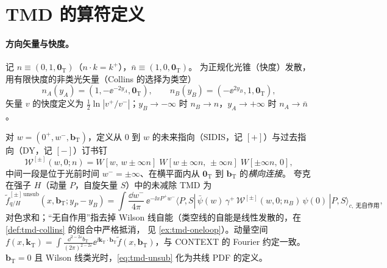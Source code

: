 \section{TMD 的算符定义}
\label{sec:tmd-definitions}

\paragraph{方向矢量与快度。}
记 $n\equiv(0,1,\boldsymbol 0_{\mathrm T})$（$n\cdot k=k^+$），$\bar n\equiv(1,0,\boldsymbol 0_{\mathrm T})$。
为正规化光锥（快度）发散，用有限快度的非类光矢量（Collins 的选择为类空）
\begin{equation}
  n_A(y_A)=(1,-\ee^{-2y_A},\boldsymbol 0_{\mathrm T}),\qquad
  n_B(y_B)=(-\ee^{2y_B},1,\boldsymbol 0_{\mathrm T}),
  \label{eq:tmd-nAnB}
\end{equation}
矢量 $v$ 的快度定义为 $\tfrac12\ln|v^+/v^-|$；$y_B\to-\infty$ 时 $n_B\to n$，$y_A\to+\infty$ 时 $n_A\to\bar n$。

\begin{definition}
\label{def:tmd-unsub}
对 $w=(0^+,w^-,\boldsymbol b_{\mathrm T})$，定义从 $0$ 到 $w$ 的未来指向（SIDIS，记 $[+]$）与过去指向（DY，记 $[-]$）订书钉
\begin{equation}
  \mathcal W^{[\pm]}(w,0;n)=W[w,\,w\pm\infty n]\;W[w\pm\infty n,\,\pm\infty n]\;W[\pm\infty n,\,0],
  \label{eq:tmd-staple}
\end{equation}
中间一段是位于光前时间 $w^-=\pm\infty$、在横平面内从 $\boldsymbol 0_{\mathrm T}$ 到 $\boldsymbol b_{\mathrm T}$ 的\emph{横向连接}。
夸克在强子 $H$（动量 $P$，自旋矢量 $S$）中的未减除 TMD 为
\begin{equation}
  \tilde f^{[\pm]\,\mathrm{unsub}}_{q/H}(x,\boldsymbol b_{\mathrm T};y_P-y_B)
  =\int\frac{\dd w^-}{4\pi}\,\ee^{-\ii xP^+w^-}
   \langle P,S|\,\bar\psi(w)\,\gamma^+\,\mathcal W^{[\pm]}(w,0;n_B)\,\psi(0)\,|P,S\rangle_{c,\ \text{无自作用}},
  \label{eq:tmd-unsub}
\end{equation}
对色求和；“无自作用”指去掉 Wilson 线自能（类空线的自能是线性发散的，在 \cref{def:tmd-collins} 的组合中严格抵消，
见 \cref{ex:tmd-oneloop}）。动量空间 $f(x,\boldsymbol k_{\mathrm T})=\int\frac{\dd^{2-2\varepsilon}b_{\mathrm T}}{(2\pi)^{2-2\varepsilon}}
\ee^{\ii\boldsymbol k_{\mathrm T}\cdot\boldsymbol b_{\mathrm T}}\tilde f(x,\boldsymbol b_{\mathrm T})$，与 CONTEXT 的 Fourier 约定一致。
$\boldsymbol b_{\mathrm T}=0$ 且 Wilson 线类光时，\eqref{eq:tmd-unsub} 化为共线 PDF 的定义。
\end{definition}

